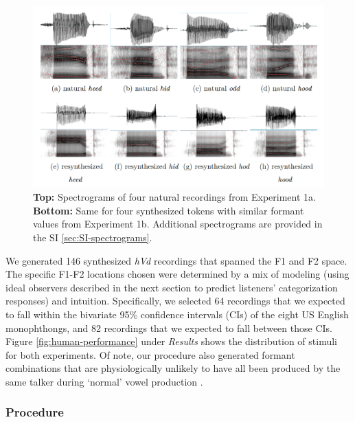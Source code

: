 \documentclass[preprint]{JASA}
\begin{document}
\begin{figure}[!ht]

{\centering \includegraphics[width=1\linewidth]{./Figure3} 

}

\caption{\textbf{Top:} Spectrograms of four natural recordings from Experiment 1a. \textbf{Bottom:} Same for four synthesized tokens with similar formant values from Experiment 1b. Additional spectrograms are provided in the SI \ref{sec:SI-spectrograms}.}\label{fig:spectrograms}
\end{figure}

We generated 146 synthesized \emph{hVd} recordings that spanned the F1 and F2 space. The specific F1-F2 locations chosen were determined by a mix of modeling (using ideal observers described in the next section to predict listeners' categorization responses) and intuition. Specifically, we selected 64 recordings that we expected to fall within the bivariate 95\% confidence intervals (CIs) of the eight US English monophthongs, and 82 recordings that we expected to fall between those CIs. Figure \ref{fig:human-performance} under \emph{Results} shows the distribution of stimuli for both experiments. Of note, our procedure also generated formant combinations that are physiologically unlikely to have all been produced by the same talker during `normal' vowel production \citep[also known as ``off-template'' instances,][]{nearey1978}.

\subsubsection{Procedure}\label{sec:procedure}
\end{document}

